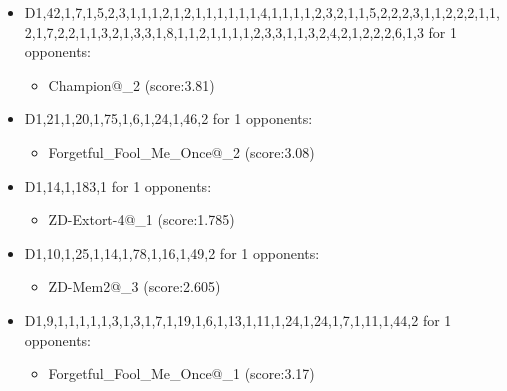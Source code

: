 \begin{appendices}
\begin{itemize}
        \item D1,42,1,7,1,5,2,3,1,1,1,2,1,2,1,1,1,1,1,1,4,1,1,1,1,2,3,2,1,1,5,2,2,2,3,1,1,2,2,2,1,1,2,1,7,2,2,1,1,3,2,1,3,3,1,8,1,1,2,1,1,1,1,2,3,3,1,1,3,2,4,2,1,2,2,2,6,1,3 for 1 opponents:
        \begin{multicols}{3}
            \begin{itemize}
                \item Champion@\_2 (score:3.81)
            \end{itemize}
        \end{multicols}

        \item D1,21,1,20,1,75,1,6,1,24,1,46,2 for 1 opponents:
        \begin{multicols}{3}
            \begin{itemize}
                \item Forgetful\_Fool\_Me\_Once@\_2 (score:3.08)
            \end{itemize}
        \end{multicols}

        \item D1,14,1,183,1 for 1 opponents:
        \begin{multicols}{3}
            \begin{itemize}
                \item ZD-Extort-4@\_1 (score:1.785)
            \end{itemize}
        \end{multicols}

        \item D1,10,1,25,1,14,1,78,1,16,1,49,2 for 1 opponents:
        \begin{multicols}{3}
            \begin{itemize}
                \item ZD-Mem2@\_3 (score:2.605)
            \end{itemize}
        \end{multicols}

        \item D1,9,1,1,1,1,1,3,1,3,1,7,1,19,1,6,1,13,1,11,1,24,1,24,1,7,1,11,1,44,2 for 1 opponents:
        \begin{multicols}{3}
            \begin{itemize}
                \item Forgetful\_Fool\_Me\_Once@\_1 (score:3.17)
            \end{itemize}
        \end{multicols}


\end{itemize}
\end{appendices}
